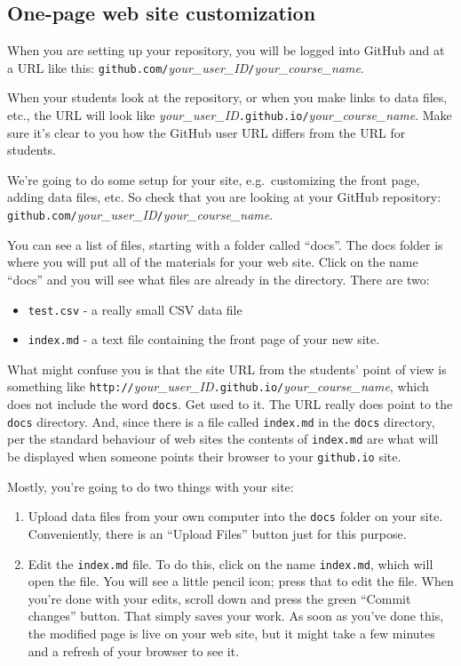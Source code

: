 \documentclass[]{book}
\providecommand{\tightlist}{%
  \setlength{\itemsep}{0pt}\setlength{\parskip}{0pt}}
\theoremstyle{definition}
\theoremstyle{definition}
\theoremstyle{definition}
\theoremstyle{remark}
\begin{document}
\subsection{One-page web site
customization}\label{one-page-web-site-customization}

When you are setting up your repository, you will be logged into GitHub
and at a URL like this:
\texttt{github.com/}\emph{your\_user\_ID}\texttt{/}\emph{your\_course\_name}.

When your students look at the repository, or when you make links to
data files, etc., the URL will look like
\emph{your\_user\_ID}\texttt{.github.io/}\emph{your\_course\_name}. Make
sure it's clear to you how the GitHub user URL differs from the URL for
students.

We're going to do some setup for your site, e.g.~customizing the front
page, adding data files, etc. So check that you are looking at your
GitHub repository:
\texttt{github.com/}\emph{your\_user\_ID}\texttt{/}\emph{your\_course\_name}.

You can see a list of files, starting with a folder called ``docs''. The
docs folder is where you will put all of the materials for your web
site. Click on the name ``docs'' and you will see what files are already
in the directory. There are two:

\begin{itemize}
\tightlist
\item
  \texttt{test.csv} - a really small CSV data file
\item
  \texttt{index.md} - a text file containing the front page of your new
  site.
\end{itemize}

What might confuse you is that the site URL from the students' point of
view is something like
\texttt{http://}\emph{your\_user\_ID}\texttt{.github.io/}\emph{your\_course\_name},
which does not include the word \texttt{docs}. Get used to it. The URL
really does point to the \texttt{docs} directory. And, since there is a
file called \texttt{index.md} in the \texttt{docs} directory, per the
standard behaviour of web sites the contents of \texttt{index.md} are
what will be displayed when someone points their browser to your
\texttt{github.io} site.

Mostly, you're going to do two things with your site:

\begin{enumerate}
\def\labelenumi{\arabic{enumi}.}
\tightlist
\item
  Upload data files from your own computer into the \texttt{docs} folder
  on your site. Conveniently, there is an ``Upload Files'' button just
  for this purpose.
\item
  Edit the \texttt{index.md} file. To do this, click on the name
  \texttt{index.md}, which will open the file. You will see a little
  pencil icon; press that to edit the file. When you're done with your
  edits, scroll down and press the green ``Commit changes'' button. That
  simply saves your work. As soon as you've done this, the modified page
  is live on your web site, but it might take a few minutes and a
  refresh of your browser to see it.
\end{enumerate}
\end{document}

